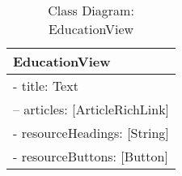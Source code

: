 \begin{table}[H]
\centering
\caption{Class Diagram: EducationView}

\hspace{1em}
\renewcommand{\arraystretch}{1.7}

\begin{tabular}{|l|}
\hline
\textbf{EducationView} \\
\hline
- title: Text \\
– articles: [ArticleRichLink] \\
- resourceHeadings: [String] \\
- resourceButtons: [Button] \\
\hline
\end{tabular}
\end{table}
